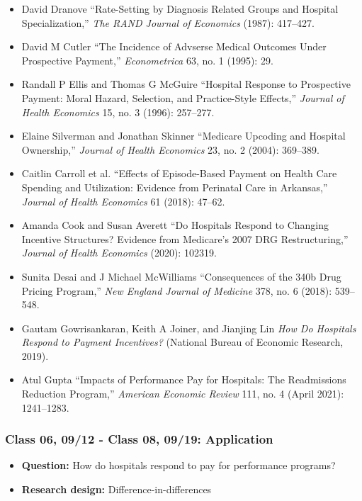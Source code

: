 \documentclass[11pt,]{article}
\providecommand{\tightlist}{%
  \setlength{\itemsep}{0pt}\setlength{\parskip}{0pt}}
\begin{document}
\begin{itemize}
\tightlist
\item
  David Dranove {``Rate-Setting by Diagnosis Related Groups and Hospital
  Specialization,''} \emph{The RAND Journal of Economics} (1987):
  417--427.
\item
  David M Cutler {``The {Incidence} of {Advserse} {Medical} {Outcomes}
  Under {Prospective} {Payment},''} \emph{Econometrica} 63, no. 1
  (1995): 29.
\item
  Randall P Ellis and Thomas G McGuire {``Hospital Response to
  Prospective Payment: Moral Hazard, Selection, and Practice-Style
  Effects,''} \emph{Journal of Health Economics} 15, no. 3 (1996):
  257--277.
\item
  Elaine Silverman and Jonathan Skinner {``Medicare Upcoding and
  Hospital Ownership,''} \emph{Journal of Health Economics} 23, no. 2
  (2004): 369--389.
\item
  Caitlin Carroll et al. {``Effects of Episode-Based Payment on Health
  Care Spending and Utilization: {Evidence} from Perinatal Care in
  {Arkansas},''} \emph{Journal of Health Economics} 61 (2018): 47--62.
\item
  Amanda Cook and Susan Averett {``Do {Hospitals} {Respond} to
  {Changing} {Incentive} {Structures}? {Evidence} from {Medicare}'s 2007
  {DRG} {Restructuring},''} \emph{Journal of Health Economics} (2020):
  102319.
\item
  Sunita Desai and J Michael McWilliams {``Consequences of the {340b}
  Drug Pricing Program,''} \emph{New England Journal of Medicine} 378,
  no. 6 (2018): 539--548.
\item
  Gautam Gowrisankaran, Keith A Joiner, and Jianjing Lin \emph{How Do
  {Hospitals} {Respond} to {Payment} {Incentives}?} (National Bureau of
  Economic Research, 2019).
\item
  Atul Gupta {``Impacts of {Performance} {Pay} for {Hospitals}: {The}
  {Readmissions} {Reduction} {Program},''} \emph{American Economic
  Review} 111, no. 4 (April 2021): 1241--1283.
\end{itemize}

\hypertarget{class-06-0912---class-08-0919-application}{%
\subsubsection{Class 06, 09/12 - Class 08, 09/19:
Application}\label{class-06-0912---class-08-0919-application}}

\begin{itemize}
\tightlist
\item
  \textbf{Question:} How do hospitals respond to pay for performance
  programs?
\item
  \textbf{Research design:} Difference-in-differences
\end{itemize}
\end{document}
